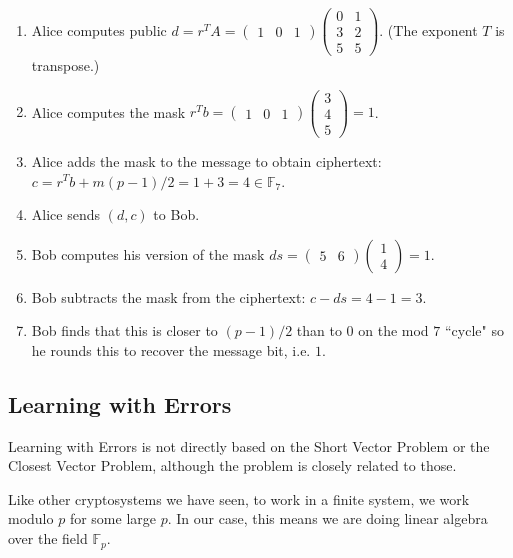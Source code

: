 \documentclass{article}
\theoremstyle{plain}
\theoremstyle{definition}
\theoremstyle{remark}
\numberwithin{theorem}{section}
\newcommand{\FF}{\mathbb{F}}
\begin{document}
\begin{enumerate}
    \item Alice computes public $d = r^TA = 
    \begin{pmatrix} 1 & 0 & 1 \end{pmatrix}\begin{pmatrix} 0 & 1 \\ 3 & 2 \\ 5 & 5 \end{pmatrix}$.  (The exponent $T$ is transpose.)
    \item Alice computes the mask $r^T b =  \begin{pmatrix} 1 & 0 & 1 \end{pmatrix} \begin{pmatrix} 3 \\ 4 \\ 5 \end{pmatrix} =  1$.
    \item Alice adds the mask to the message to obtain ciphertext: $c = r^Tb + m(p-1)/2 = 1 + 3 = 4 \in \FF_7$.
    \item Alice sends $(d,c)$ to Bob.
    \item Bob computes his version of the mask $ds = \begin{pmatrix} 5 & 6 \end{pmatrix} \begin{pmatrix} 1 \\ 4 \end{pmatrix} = 1$.
    \item Bob subtracts the mask from the ciphertext: $c-ds = 4 - 1 = 3$.
    \item Bob finds that this is closer to $(p-1)/2$ than to $0$ on the mod $7$ ``cycle" so he rounds this to recover the message bit, i.e. $1$.
\end{enumerate}





\subsection{Learning with Errors}

Learning with Errors is not directly based on the Short Vector Problem or the Closest Vector Problem, although the problem is closely related to those.

Like other cryptosystems we have seen, to work in a finite system, we work modulo $p$ for some large $p$.  In our case, this means we are doing linear algebra over the field $\mathbb{F}_p$.
\end{document}
